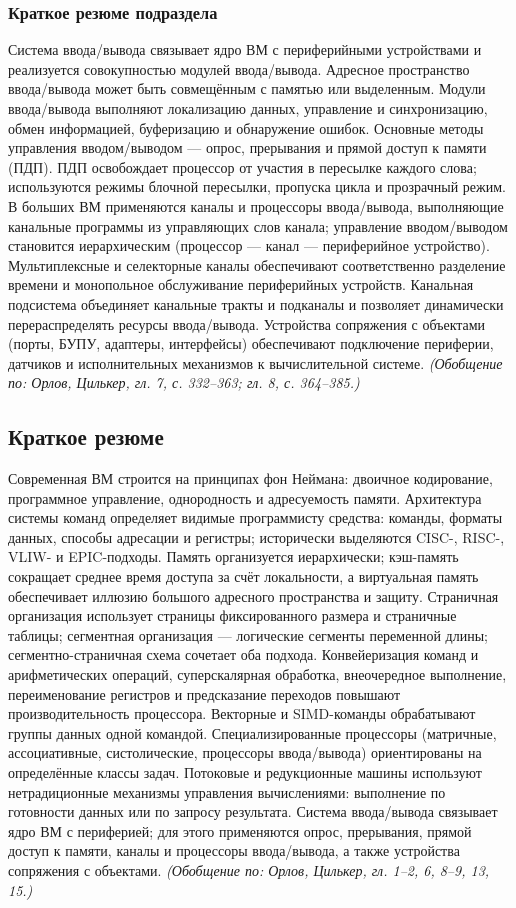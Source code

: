 \documentclass[a4paper,12pt]{article}
\begin{document}
\subsubsection{Краткое резюме подраздела}
Система ввода/вывода связывает ядро ВМ с периферийными устройствами и реализуется совокупностью модулей ввода/вывода. Адресное пространство ввода/вывода может быть совмещённым с памятью или выделенным. Модули ввода/вывода выполняют локализацию данных, управление и синхронизацию, обмен информацией, буферизацию и обнаружение ошибок. Основные методы управления вводом/выводом — опрос, прерывания и прямой доступ к памяти (ПДП). ПДП освобождает процессор от участия в пересылке каждого слова; используются режимы блочной пересылки, пропуска цикла и прозрачный режим. В больших ВМ применяются каналы и процессоры ввода/вывода, выполняющие канальные программы из управляющих слов канала; управление вводом/выводом становится иерархическим (процессор — канал — периферийное устройство). Мультиплексные и селекторные каналы обеспечивают соответственно разделение времени и монопольное обслуживание периферийных устройств. Канальная подсистема объединяет канальные тракты и подканалы и позволяет динамически перераспределять ресурсы ввода/вывода. Устройства сопряжения с объектами (порты, БУПУ, адаптеры, интерфейсы) обеспечивают подключение периферии, датчиков и исполнительных механизмов к вычислительной системе.
\textit{(Обобщение по: Орлов, Цилькер, гл. 7, с. 332--363; гл. 8, с. 364--385.)}

\subsection{Краткое резюме}

Современная ВМ строится на принципах фон Неймана: двоичное кодирование, программное управление, однородность и адресуемость памяти. Архитектура системы команд определяет видимые программисту средства: команды, форматы данных, способы адресации и регистры; исторически выделяются CISC-, RISC-, VLIW- и EPIC-подходы. Память организуется иерархически; кэш-память сокращает среднее время доступа за счёт локальности, а виртуальная память обеспечивает иллюзию большого адресного пространства и защиту. Страничная организация использует страницы фиксированного размера и страничные таблицы; сегментная организация --- логические сегменты переменной длины; сегментно-страничная схема сочетает оба подхода. Конвейеризация команд и арифметических операций, суперскалярная обработка, внеочередное выполнение, переименование регистров и предсказание переходов повышают производительность процессора. Векторные и SIMD-команды обрабатывают группы данных одной командой. Специализированные процессоры (матричные, ассоциативные, систолические, процессоры ввода/вывода) ориентированы на определённые классы задач. Потоковые и редукционные машины используют нетрадиционные механизмы управления вычислениями: выполнение по готовности данных или по запросу результата. Система ввода/вывода связывает ядро ВМ с периферией; для этого применяются опрос, прерывания, прямой доступ к памяти, каналы и процессоры ввода/вывода, а также устройства сопряжения с объектами.
\textit{(Обобщение по: Орлов, Цилькер, гл. 1--2, 6, 8--9, 13, 15.)}
\end{document}
